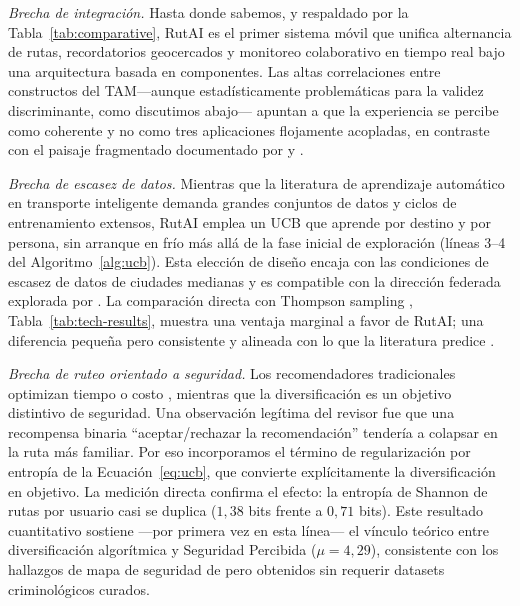 \documentclass[a4paper,fleqn]{cas-sc}
\newcommand{\RUTAI}{RutAI\xspace}
\newcommand{\UCB}{UCB\xspace}
\newcommand{\TAM}{TAM\xspace}
\begin{document}
	\emph{Brecha de integraci\'on.} Hasta donde sabemos, y respaldado por la Tabla~\ref{tab:comparative}, \RUTAI es el primer sistema m\'ovil que unifica alternancia de rutas, recordatorios geocercados y monitoreo colaborativo en tiempo real bajo una arquitectura basada en componentes. Las altas correlaciones entre constructos del \TAM ---aunque estad\'isticamente problem\'aticas para la validez discriminante, como discutimos abajo--- apuntan a que la experiencia se percibe como coherente y no como tres aplicaciones flojamente acopladas, en contraste con el paisaje fragmentado documentado por \citet{paiva2021smartmobility} y \citet{kung2023lbs}.
	
	\emph{Brecha de escasez de datos.} Mientras que la literatura de aprendizaje autom\'atico en transporte inteligente \citep{yuan2022mlits,liu2022multimodal,zhang2025drlnavigation} demanda grandes conjuntos de datos y ciclos de entrenamiento extensos, \RUTAI emplea un \UCB \citep{bouneffouf2020mabsurvey,auer2002ucb,zeng2016mab} que aprende por destino y por persona, sin arranque en fr\'io m\'as all\'a de la fase inicial de exploraci\'on (l\'ineas 3--4 del Algoritmo~\ref{alg:ucb}). Esta elecci\'on de dise\~no encaja con las condiciones de escasez de datos de ciudades medianas y es compatible con la direcci\'on federada explorada por \citet{shi2021fedmab}. La comparaci\'on directa con Thompson sampling \citep{chapelle2011thompson}, Tabla~\ref{tab:tech-results}, muestra una ventaja marginal a favor de \RUTAI; una diferencia peque\~na pero consistente y alineada con lo que la literatura predice \citep{auer2002ucb,chapelle2011thompson}.
	
	\emph{Brecha de ruteo orientado a seguridad.} Los recomendadores tradicionales optimizan tiempo o costo \citep{campigotto2017favour,guo2021online}, mientras que la diversificaci\'on es un objetivo distintivo de seguridad. Una observaci\'on leg\'itima del revisor fue que una recompensa binaria ``aceptar/rechazar la recomendaci\'on'' tender\'ia a colapsar en la ruta m\'as familiar. Por eso incorporamos el t\'ermino de regularizaci\'on por entrop\'ia de la Ecuaci\'on~\ref{eq:ucb}, que convierte expl\'icitamente la diversificaci\'on en objetivo. La medici\'on directa confirma el efecto: la entrop\'ia de Shannon de rutas por usuario casi se duplica ($1{,}38$ bits frente a $0{,}71$ bits). Este resultado cuantitativo sostiene ---por primera vez en esta l\'inea--- el v\'inculo te\'orico entre diversificaci\'on algor\'itmica y Seguridad Percibida ($\mu=4{,}29$), consistente con los hallazgos de mapa de seguridad de \citet{kim2025crimesafetymap} pero obtenidos sin requerir datasets criminol\'ogicos curados.
	
\end{document}
